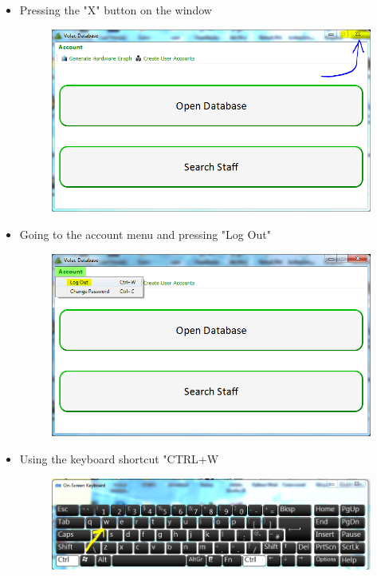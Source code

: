 \begin{itemize}
\item{Pressing the "X" button on the window}

\begin{figure}[H]
    \includegraphics[width=\textwidth]{./Manual/Images/close2.png}
\end{figure}

\item{Going to the account menu and pressing "Log Out"}

\begin{figure}[H]
    \includegraphics[width=\textwidth]{./Manual/Images/close1.png}
\end{figure}

\item{Using the keyboard shortcut "CTRL+W}

\begin{figure}[H]
    \includegraphics[width=\textwidth]{./Manual/Images/close3.png}
\end{figure}

\end{itemize}

